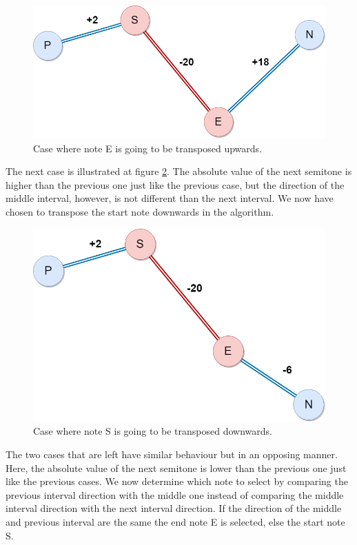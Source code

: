 \documentclass[a4paper]{article}
\begin{document}
\begin{figure}[H]
	\includegraphics[width=\textwidth]{Fotos/np_mutation/Case1.png}
	\caption{Case where note E is going to be transposed upwards.}
	\label{fig:npmut_case1}
\end{figure}

The next case is illustrated at figure \ref{fig:npmut_case2}. The absolute value of the next semitone is higher than the previous one just like the previous case, but the direction of the middle interval, however, is not different than the next interval. We now have chosen to transpose the start note downwards in the algorithm.

\begin{figure}[H]
	\includegraphics[width=\textwidth]{Fotos/np_mutation/Case2.png}
	\caption{Case where note S is going to be transposed downwards.}
	\label{fig:npmut_case2}
\end{figure}
The two cases that are left have similar behaviour but in an opposing manner. Here, the absolute value of the next semitone is lower than the previous one just like the previous cases. We now determine which note to select by comparing the previous interval direction with the middle one instead of comparing the middle interval direction with the next interval direction. If the direction of the middle and previous interval are the same the end note E is selected, else the start note S.
\end{document}
